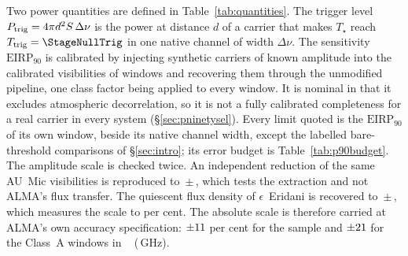 Two power quantities are defined in Table~\ref{tab:quantities}. The trigger
level $P_{\rm trig} = 4\pi d^{2}S\,\Delta\nu$ is the power at distance $d$ of a
carrier that makes $T_\star$ reach $T_{\rm trig}=\StageNullTrig$ in one native
channel of width $\Delta\nu$. The sensitivity $\mathrm{EIRP}_{90}$ is
calibrated by injecting synthetic carriers of known amplitude into the
calibrated visibilities of \SensNInj{} windows and recovering them through the
unmodified pipeline, one class factor being applied to every window. It is
nominal in that it excludes atmospheric decorrelation, so it is not a fully
calibrated completeness for a real carrier in every system
(\S\ref{sec:pninetysel}). Every limit quoted is the $\mathrm{EIRP}_{90}$ of its
own window, beside its native channel width, except the labelled
bare-threshold comparisons of \S\ref{sec:intro}; its error budget is
Table~\ref{tab:p90budget}. The amplitude scale is checked twice. An
independent reduction of the same AU~Mic visibilities is reproduced to
\PxJanRatio\,$\pm$\,\PxJanRatioErr, which tests the extraction and not ALMA's
flux transfer. The quiescent flux density of $\epsilon$~Eridani
\citep{Burton2022} is recovered to \PxEpsRatio\,$\pm$\,\PxEpsRatioErr, which
measures the scale to \SbEpsPct{} per cent. The absolute scale is therefore
carried at ALMA's own accuracy specification: $\pm11$ per cent for the
sample and $\pm21$ for the \BudNHiWin{} Class~A windows in
\BudHiBandWord~\BudHiBands{} (\BudHiGHzList\,GHz).

